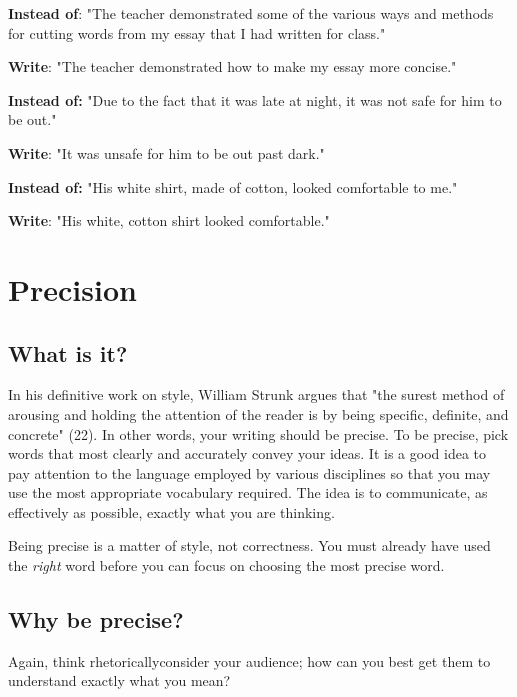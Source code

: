 \begin{enumerate}
    	\textbf{Instead of}:  	"The teacher demonstrated some of the various ways and methods
                               	for cutting words from my essay that I had written for class."
 
    	\textbf{Write}:           	"The teacher demonstrated how to make my essay more concise."
 
    	\textbf{Instead of:}  	"Due to the fact that it was late at night, it was not safe for him to
                                	be out."
 
    	\textbf{Write}:                    	"It was unsafe for him to be out past dark."
 
 
    	\textbf{Instead of:}  	"His white shirt, made of cotton, looked comfortable to me."
 
    	\textbf{Write}:        	          	"His white, cotton shirt looked comfortable."

\end{enumerate}

\chapter{Precision}
 
\section{What is it?}
 
In his definitive work on style, William Strunk argues that "the surest method of 
arousing and holding the attention of the reader is by being specific, definite, and 
concrete" (22). In other words, your writing should be precise. To be precise, pick 
words that most clearly and accurately convey your ideas.  It is a good idea to pay 
attention to the language employed by various disciplines so that you may use the 
most appropriate vocabulary required. The idea is to communicate, as effectively as 
possible, exactly what you are thinking.
 
Being precise is a matter of style, not correctness. You must already have used the 
\emph{right} word before you can focus on choosing the most precise word.
 
\section{Why be precise?}
 
Again, think rhetorically\textemdash consider your audience; how can you best get them to 
understand exactly what you mean?
 
